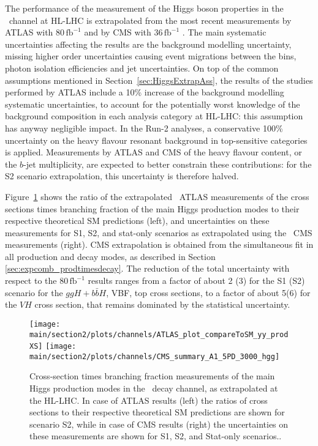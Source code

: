 The performance of the measurement of the Higgs boson properties in the \Hyy\ channel at HL-LHC is extrapolated from the most recent measurements by ATLAS with 80\,$\mathrm{fb}^{-1}$ \cite{ATLAS:2018uso} and by CMS with 36\,$\mathrm{fb}^{-1}$ \cite{Sirunyan:2018ouh}. The main systematic uncertainties affecting the results are the background modelling uncertainty,
missing higher order uncertainties
causing event migrations between the bins, photon isolation efficiencies and jet uncertainties.
%
On top of the common assumptions mentioned in Section~\ref{sec:HiggsExtrapAss}, the %
results of the studies performed by ATLAS include a 10\% increase of the background modelling systematic uncertainties, to account for the potentially worst knowledge of the background composition in each analysis category at HL-LHC: this assumption has anyway negligible impact.
%
In the Run-2 analyses, a conservative 100\% uncertainty on the heavy flavour resonant background in top-sensitive categories is applied. Measurements by ATLAS and CMS of the heavy flavour content, or the $b$-jet multiplicity, are expected to better constrain these contributions: for the S2 scenario extrapolation, this uncertainty is therefore halved.

Figure~\ref{fig:Hyy_ATLAS_HLLHC_S2} shows the ratio of the extrapolated \Hyy\ ATLAS measurements of the cross sections times branching fraction of the main Higgs production modes to their respective theoretical SM predictions (left), and uncertainties on these measurements for S1, S2, and stat-only scenarios as extrapolated using the \Hyy\ CMS measurements (right). CMS extrapolation is obtained from the simultaneous fit in all production and decay modes, as described in Section \ref{sec:expcomb_prodtimesdecay}. The reduction of the total uncertainty with respect to the 80\,$\mathrm{fb}^{-1}$ results ranges from a factor of about 2 (3) for the S1 (S2) scenario for the $ggH+b\bar{b}H$, VBF, top cross sections, to a factor of about 5(6) for the $VH$ cross section, that remains dominated by the statistical uncertainty.

\begin{figure}
  \centering
  \texttt{[image: \\main/section2/plots/channels/ATLAS\_plot\_compareToSM\_yy\_prodXS]}
  \texttt{[image: \\main/section2/plots/channels/CMS\_summary\_A1\_5PD\_3000\_hgg]}
  \caption{Cross-section times branching fraction measurements of the main Higgs production modes in the \Hyy\ decay channel, as extrapolated at the HL-LHC. In case of ATLAS results (left) the ratios of cross sections to their respective theoretical SM predictions are shown for scenario S2, while in case of CMS results (right) the uncertainties on these measurements are shown for S1, S2, and Stat-only scenarios..}
  \label{fig:Hyy_ATLAS_HLLHC_S2}
\end{figure}

